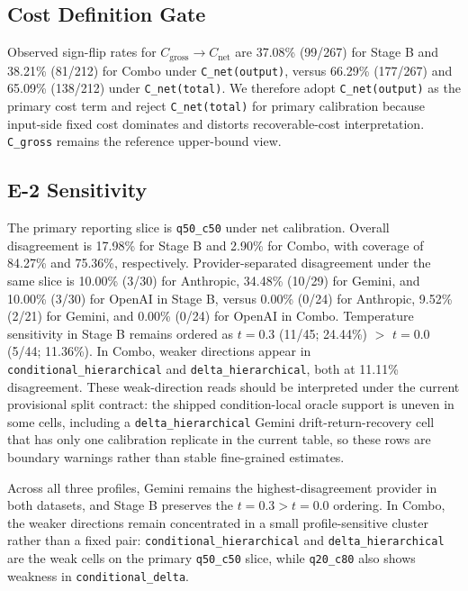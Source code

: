 \documentclass[11pt,a4paper]{article}
\begin{document}
\subsection{Cost Definition Gate}
\label{sec:costgate}

Observed sign-flip rates for $C_{\mathrm{gross}} \rightarrow C_{\mathrm{net}}$ are 37.08\% (99/267) for Stage B and 38.21\% (81/212) for Combo under \texttt{C\_net(output)}, versus 66.29\% (177/267) and 65.09\% (138/212) under \texttt{C\_net(total)}. We therefore adopt \texttt{C\_net(output)} as the primary cost term and reject \texttt{C\_net(total)} for primary calibration because input-side fixed cost dominates and distorts recoverable-cost interpretation. \texttt{C\_gross} remains the reference upper-bound view.

\subsection{E-2 Sensitivity}

The primary reporting slice is \texttt{q50\_c50} under net calibration. Overall disagreement is 17.98\% for Stage B and 2.90\% for Combo, with coverage of 84.27\% and 75.36\%, respectively. Provider-separated disagreement under the same slice is 10.00\% (3/30) for Anthropic, 34.48\% (10/29) for Gemini, and 10.00\% (3/30) for OpenAI in Stage B, versus 0.00\% (0/24) for Anthropic, 9.52\% (2/21) for Gemini, and 0.00\% (0/24) for OpenAI in Combo. Temperature sensitivity in Stage B remains ordered as $t=0.3$ (11/45; 24.44\%) $>$ $t=0.0$ (5/44; 11.36\%). In Combo, weaker directions appear in \texttt{conditional\_hierarchical} and \texttt{delta\_hierarchical}, both at 11.11\% disagreement. These weak-direction reads should be interpreted under the current provisional split contract: the shipped condition-local oracle support is uneven in some cells, including a \texttt{delta\_hierarchical} Gemini drift-return-recovery cell that has only one calibration replicate in the current table, so these rows are boundary warnings rather than stable fine-grained estimates.

Across all three profiles, Gemini remains the highest-disagreement provider in both datasets, and Stage B preserves the $t=0.3 > t=0.0$ ordering. In Combo, the weaker directions remain concentrated in a small profile-sensitive cluster rather than a fixed pair: \texttt{conditional\_hierarchical} and \texttt{delta\_hierarchical} are the weak cells on the primary \texttt{q50\_c50} slice, while \texttt{q20\_c80} also shows weakness in \texttt{conditional\_delta}.
\end{document}
